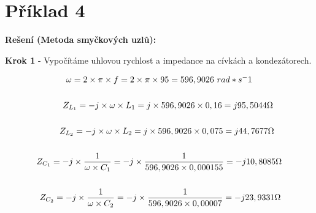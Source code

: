 \section{Příklad 4}

\vspace{1cm}
\large{\textbf{Rešení (Metoda smyčkových uzlů):}}
\vspace{0.5cm}

\begin{center}
\textbf{Krok 1} - Vypočítáme uhlovou rychlost a impedance na cívkách a kondezátorech. \\
\end{center}
\vspace{-0.5cm}

\begin{gather*}
\omega = 2 \times \pi \times f = 2 \times \pi \times 95 = 596,9026\ rad*s^-1 \\\\
\newline
\newline
Z_{L_1} = -j \times \omega \times L_1 = j \times 596,9026 \times 0,16 = j95,5044 \Omega \\\\
\newline
\newline
Z_{L_2} = -j \times \omega \times L_2 = j \times 596,9026 \times 0,075 = j44,7677 \Omega \\\\
\newline
\newline
Z_{C_1} = -j \times \frac{1}{\omega \times C_1}  = -j \times \frac{1}{596,9026 \times 0,000155} = -j10,8085 \Omega \\\\
\newline
\newline
Z_{C_2} = -j \times \frac{1}{\omega \times C_2}  = -j \times \frac{1}{596,9026 \times 0,00007} = -j23,9331 \Omega \\\\
\end{gather*}

\newpage

